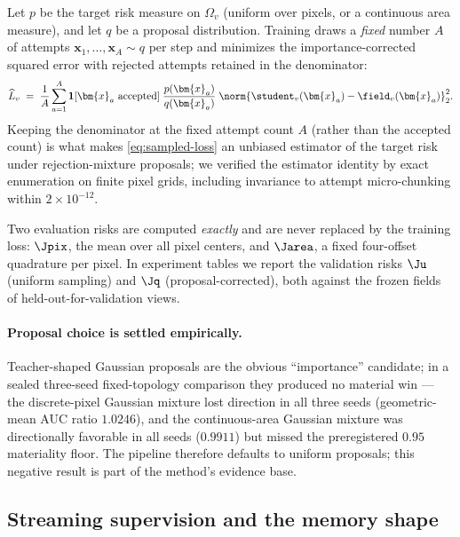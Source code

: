 Let $p$ be the target risk measure on $\Omega_v$ (uniform over pixels, or a continuous area
measure), and let $q$ be a proposal distribution.  Training draws a \emph{fixed} number $A$ of
attempts $\bm{x}_1, \dots, \bm{x}_A \sim q$ per step and minimizes the importance-corrected
squared error with rejected attempts retained in the denominator:
\begin{equation}
  \widehat{L}_v \;=\;
  \frac{1}{A} \sum_{a=1}^{A}
  \mathbf{1}[\bm{x}_a \text{ accepted}]\;
  \frac{p(\bm{x}_a)}{q(\bm{x}_a)}\;
  \norm{\student_v(\bm{x}_a) - \field_v(\bm{x}_a)}_2^2 .
  \label{eq:sampled-loss}
\end{equation}
Keeping the denominator at the fixed attempt count $A$ (rather than the accepted count) is
what makes \cref{eq:sampled-loss} an unbiased estimator of the target risk under
rejection-mixture proposals; we verified the estimator identity by exact enumeration on finite
pixel grids, including invariance to attempt micro-chunking within
$2\times10^{-12}$.

Two evaluation risks are computed \emph{exactly} and are never replaced by the training loss:
$\Jpix$, the mean over all pixel centers, and $\Jarea$, a fixed four-offset quadrature per
pixel.  In experiment tables we report the validation risks $\Ju$ (uniform sampling) and
$\Jq$ (proposal-corrected), both against the frozen fields of held-out-for-validation
views.

\paragraph{Proposal choice is settled empirically.}
Teacher-shaped Gaussian proposals are the obvious ``importance'' candidate; in a sealed
three-seed fixed-topology comparison they produced no material win --- the discrete-pixel
Gaussian mixture lost direction in all three seeds (geometric-mean AUC ratio $1.0246$), and
the continuous-area Gaussian mixture was directionally favorable in all seeds
($0.9911$) but missed the preregistered $0.95$ materiality floor.  The pipeline therefore
defaults to uniform proposals; this negative result is part of the method's evidence
base.

\subsection{Streaming supervision and the memory shape}
\label{sec:streaming}


